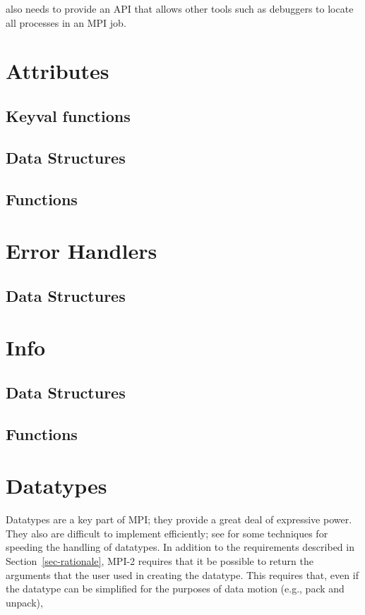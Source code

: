 \documentclass{article}
\begin{document}
 also needs to provide an API that allows other tools such as
debuggers to locate all processes in an MPI job.

\section{Attributes}


\subsection{Keyval functions}

\subsection{Data Structures}

\subsection{Functions}


\section{Error Handlers}
\subsection{Data Structures}


\section{Info}

\subsection{Data Structures}

\subsection{Functions}


\section{Datatypes}
Datatypes are a key part of MPI; they provide a great deal of expressive
power.  They also are difficult to implement efficiently; see 
\cite{gropp-swider-lusk99,Traeff:1999:FFE} for some techniques for speeding
the handling of datatypes.
In addition to the requirements described in Section~\ref{sec-rationale}, 
MPI-2 requires that it be possible to return the arguments that the user
used in creating the datatype.  This requires that, even if the datatype can
be simplified for the purposes of data motion (e.g., pack and unpack), 
\end{document}
